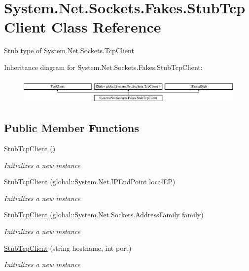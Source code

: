 \hypertarget{class_system_1_1_net_1_1_sockets_1_1_fakes_1_1_stub_tcp_client}{\section{System.\-Net.\-Sockets.\-Fakes.\-Stub\-Tcp\-Client Class Reference}
\label{class_system_1_1_net_1_1_sockets_1_1_fakes_1_1_stub_tcp_client}
}


Stub type of System.\-Net.\-Sockets.\-Tcp\-Client 


Inheritance diagram for System.\-Net.\-Sockets.\-Fakes.\-Stub\-Tcp\-Client\-:\begin{figure}[H]
\begin{center}
\leavevmode
\includegraphics[height=1.342926cm]{class_system_1_1_net_1_1_sockets_1_1_fakes_1_1_stub_tcp_client}
\end{center}
\end{figure}
\subsection*{Public Member Functions}
\begin{DoxyCompactItemize}
\item 
\hyperlink{class_system_1_1_net_1_1_sockets_1_1_fakes_1_1_stub_tcp_client_a46ec435eed8cefb9a976aa1fbef5c367}{Stub\-Tcp\-Client} ()
\begin{DoxyCompactList}\small\item\em Initializes a new instance\end{DoxyCompactList}\item 
\hyperlink{class_system_1_1_net_1_1_sockets_1_1_fakes_1_1_stub_tcp_client_ad8e0349b4cbdb441796d8a245666ed2a}{Stub\-Tcp\-Client} (global\-::\-System.\-Net.\-I\-P\-End\-Point local\-E\-P)
\begin{DoxyCompactList}\small\item\em Initializes a new instance\end{DoxyCompactList}\item 
\hyperlink{class_system_1_1_net_1_1_sockets_1_1_fakes_1_1_stub_tcp_client_abf9c76da76203b20141dec77c48abc1c}{Stub\-Tcp\-Client} (global\-::\-System.\-Net.\-Sockets.\-Address\-Family family)
\begin{DoxyCompactList}\small\item\em Initializes a new instance\end{DoxyCompactList}\item 
\hyperlink{class_system_1_1_net_1_1_sockets_1_1_fakes_1_1_stub_tcp_client_a6859c9c71f10de8735656199e38c0bee}{Stub\-Tcp\-Client} (string hostname, int port)
\begin{DoxyCompactList}\small\item\em Initializes a new instance\end{DoxyCompactList}\end{DoxyCompactItemize}
